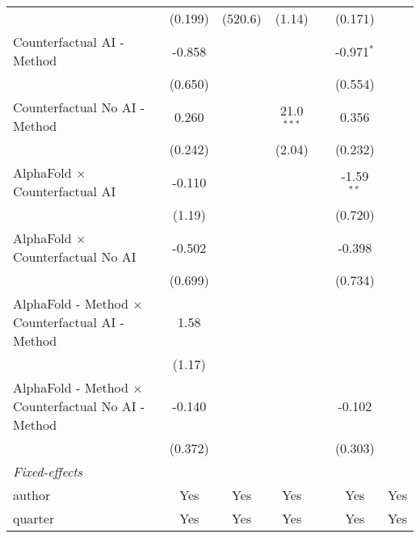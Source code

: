 \begin{tabular}{lcccccc}
                                                              & (0.199)  & (520.6)          & (1.14)       &      & (0.171)      &   \\   
   Counterfactual AI - Method                                 & -0.858   &                  &              &      & -0.971$^{*}$ &   \\   
                                                              & (0.650)  &                  &              &      & (0.554)      &   \\   
   Counterfactual No AI - Method                              & 0.260    &                  & 21.0$^{***}$ &      & 0.356        &   \\   
                                                              & (0.242)  &                  & (2.04)       &      & (0.232)      &   \\   
   AlphaFold $\times$ Counterfactual AI                       & -0.110   &                  &              &      & -1.59$^{**}$ &   \\   
                                                              & (1.19)   &                  &              &      & (0.720)      &   \\   
   AlphaFold $\times$ Counterfactual No AI                    & -0.502   &                  &              &      & -0.398       &   \\   
                                                              & (0.699)  &                  &              &      & (0.734)      &   \\   
   AlphaFold - Method $\times$ Counterfactual AI - Method     & 1.58     &                  &              &      &              &   \\   
                                                              & (1.17)   &                  &              &      &              &   \\   
   AlphaFold - Method $\times$ Counterfactual No AI - Method  & -0.140   &                  &              &      & -0.102       &   \\   
                                                              & (0.372)  &                  &              &      & (0.303)      &   \\   
   \midrule
   \emph{Fixed-effects}\\
   author                                                     & Yes      & Yes              & Yes          &      & Yes          & Yes\\  
   quarter                                                    & Yes      & Yes              & Yes          &      & Yes          & Yes\\  

\end{tabular}
